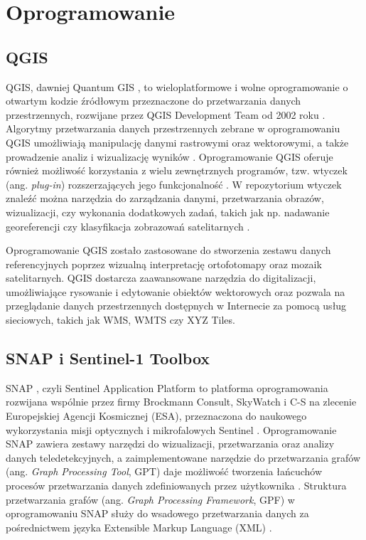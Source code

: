 \documentclass{amuthesis}
\begin{document}
\hypertarget{oprogramowanie}{%
\section{Oprogramowanie}\label{oprogramowanie}}

\hypertarget{qgis}{%
\subsection{QGIS}\label{qgis}}

QGIS, dawniej Quantum GIS \autocite{qgis}, to wieloplatformowe i wolne
oprogramowanie o otwartym kodzie źródłowym przeznaczone do przetwarzania
danych przestrzennych, rozwijane przez QGIS Development Team od 2002
roku \autocite{hejmanowska_2020_dane,flenniken_2020_qgis}. Algorytmy
przetwarzania danych przestrzennych zebrane w oprogramowaniu QGIS
umożliwiają manipulację danymi rastrowymi oraz wektorowymi, a także
prowadzenie analiz i wizualizację wyników
\autocite{hejmanowska_2020_dane}. Oprogramowanie QGIS oferuje również
możliwość korzystania z wielu zewnętrznych programów, tzw. wtyczek (ang.
\emph{plug-in}) rozszerzających jego funkcjonalność
\autocite{hejmanowska_2020_dane}. W repozytorium wtyczek znaleźć można
narzędzia do zarządzania danymi, przetwarzania obrazów, wizualizacji,
czy wykonania dodatkowych zadań, takich jak np. nadawanie georeferencji
czy klasyfikacja zobrazowań satelitarnych
\autocite{hejmanowska_2020_dane}.

Oprogramowanie QGIS zostało zastosowane do stworzenia zestawu danych
referencyjnych poprzez wizualną interpretację ortofotomapy oraz mozaik
satelitarnych. QGIS dostarcza zaawansowane narzędzia do digitalizacji,
umożliwiające rysowanie i edytowanie obiektów wektorowych oraz pozwala
na przeglądanie danych przestrzennych dostępnych w Internecie za pomocą
usług sieciowych, takich jak WMS, WMTS czy XYZ Tiles.

\hypertarget{snap-i-sentinel-1-toolbox}{%
\subsection{SNAP i Sentinel-1 Toolbox}\label{snap-i-sentinel-1-toolbox}}

SNAP \autocite{snap}, czyli Sentinel Application Platform to platforma
oprogramowania rozwijana wspólnie przez firmy Brockmann Consult,
SkyWatch i C-S na zlecenie Europejskiej Agencji Kosmicznej (ESA),
przeznaczona do naukowego wykorzystania misji optycznych i mikrofalowych
Sentinel \autocite{snap-desktop,esa_snap}. Oprogramowanie SNAP zawiera
zestawy narzędzi do wizualizacji, przetwarzania oraz analizy danych
teledetekcyjnych, a zaimplementowane narzędzie do przetwarzania grafów
(ang. \emph{Graph Processing Tool}, GPT) daje możliwość tworzenia
łańcuchów procesów przetwarzania danych zdefiniowanych przez użytkownika
\autocite{hejmanowska_2020_dane,moskolai_2022_s1_workflow}. Struktura
przetwarzania grafów (ang. \emph{Graph Processing Framework}, GPF) w
oprogramowaniu SNAP służy do wsadowego przetwarzania danych za
pośrednictwem języka Extensible Markup Language (XML)
\autocite{moskolai_2022_s1_workflow}.
\end{document}
